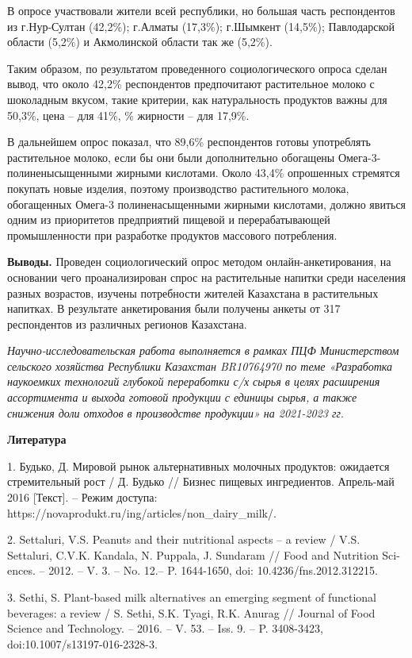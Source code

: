 В опросе участвовали жители всей республики, но большая часть
респондентов из г.Нур-Султан (42,2\%); г.Алматы (17,3\%); г.Шымкент
(14,5\%); Павлодарской области (5,2\%) и Акмолинской области так же
(5,2\%).

Таким образом, по результатом проведенного социологического опроса
сделан вывод, что около 42,2\% респондентов предпочитают растительное
молоко с шоколадным вкусом, такие критерии, как натуральность продуктов
важны для 50,3\%, цена -- для 41\%, \% жирности -- для 17,9\%.

В дальнейшем опрос показал, что 89,6\% респондентов готовы употреблять
растительное молоко, если бы они были дополнительно обогащены
Омега-3-полиненысыщенными жирными кислотами. Около 43,4\% опрошенных
стремятся покупать новые изделия, поэтому производство растительного
молока, обогащенных Омега-3 полиненасыщенными жирными кислотами, должно
явиться одним из приоритетов предприятий пищевой и перерабатывающей
промышленности при разработке продуктов массового потребления.

{\bfseries Выводы.} Проведен социологический опрос методом
онлайн-анкетирования, на основании чего проанализирован спрос на
растительные напитки среди населения разных возрастов, изучены
потребности жителей Казахстана в растительных напитках. В результате
анкетирования были получены анкеты от 317 респондентов из различных
регионов Казахстана.

\emph{Научно-исследовательская работа выполняется в рамках ПЦФ
Министерством сельского хозяйства Республики Казахстан BR10764970 по
теме «Разработка наукоемких технологий глубокой переработки с/х сырья в
целях расширения ассортимента и выхода готовой продукции с единицы
сырья, а также снижения доли отходов в производстве продукции» на
2021-2023 гг}.

{\bfseries Литература}

1. Будько, Д. Мировой рынок альтернативных молочных продуктов: ожидается
стремительный рост / Д. Будько // Бизнес пищевых ингредиентов.
Апрель-май 2016 {[}Текст{]}. -- Режим доступа:
https://novaprodukt.ru/ing/articles/non\_dairy\_milk/.

2. Settaluri, V.S. Peanuts and their nutritional aspects -- a review /
V.S. Settaluri, C.V.K. Kandala, N. Puppala, J. Sundaram // Food and
Nutrition Sci-ences. -- 2012. -- V. 3. -- No. 12.-- P. 1644-1650, doi:
10.4236/fns.2012.312215.

3. Sethi, S. Plant-based milk alternatives an emerging segment of
functional beverages: a review / S. Sethi, S.K. Tyagi, R.K. Anurag //
Journal of Food Science and Technology. -- 2016. -- V. 53. -- Iss. 9. --
P. 3408-3423, doi:10.1007/s13197-016-2328-3.

